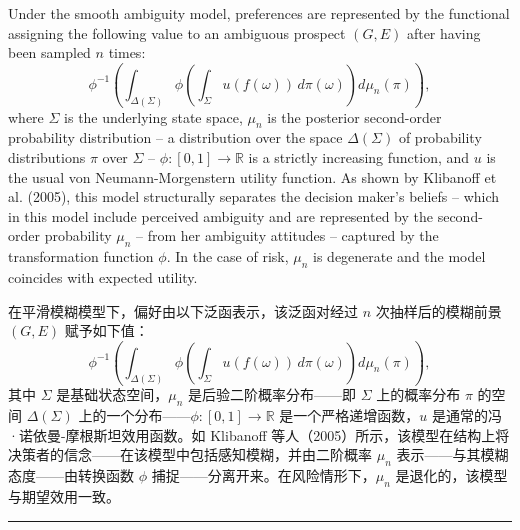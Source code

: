 \documentclass[12pt,a4paper]{article}
\newenvironment{original}
  {\par\vspace{0.5em}\noindent\color{black}\ignorespaces}
  {\par\vspace{0.3em}}
\newenvironment{translation}
  {\par\noindent\color{transblue}\ignorespaces}
  {\par\vspace{0.8em}\hrule\vspace{0.5em}}
\begin{document}
\begin{original}
Under the smooth ambiguity model, preferences are represented by the functional assigning the following value to an ambiguous prospect $(G, E)$ after having been sampled $n$ times:
\begin{equation}
\phi^{-1}\left( \int_{\Delta(\Sigma)} \phi\left( \int_\Sigma u(f(\omega))\, d\pi(\omega) \right) d\mu_n(\pi) \right), \label{eq:smooth}
\end{equation}
where $\Sigma$ is the underlying state space, $\mu_n$ is the posterior second-order probability distribution -- a distribution over the space $\Delta(\Sigma)$ of probability distributions $\pi$ over $\Sigma$ -- $\phi : [0,1] \to \mathbb{R}$ is a strictly increasing function, and $u$ is the usual von Neumann-Morgenstern utility function. As shown by Klibanoff et al. (2005), this model structurally separates the decision maker's beliefs -- which in this model include perceived ambiguity and are represented by the second-order probability $\mu_n$ -- from her ambiguity attitudes -- captured by the transformation function $\phi$. In the case of risk, $\mu_n$ is degenerate and the model coincides with expected utility.
\end{original}

\begin{translation}
在平滑模糊模型下，偏好由以下泛函表示，该泛函对经过 $n$ 次抽样后的模糊前景 $(G, E)$ 赋予如下值：
\begin{equation}
\phi^{-1}\left( \int_{\Delta(\Sigma)} \phi\left( \int_\Sigma u(f(\omega))\, d\pi(\omega) \right) d\mu_n(\pi) \right),
\end{equation}
其中 $\Sigma$ 是基础状态空间，$\mu_n$ 是后验二阶概率分布——即 $\Sigma$ 上的概率分布 $\pi$ 的空间 $\Delta(\Sigma)$ 上的一个分布——$\phi : [0,1] \to \mathbb{R}$ 是一个严格递增函数，$u$ 是通常的冯·诺依曼-摩根斯坦效用函数。如 Klibanoff 等人（2005）所示，该模型在结构上将决策者的信念——在该模型中包括感知模糊，并由二阶概率 $\mu_n$ 表示——与其模糊态度——由转换函数 $\phi$ 捕捉——分离开来。在风险情形下，$\mu_n$ 是退化的，该模型与期望效用一致。
\end{translation}
\end{document}
